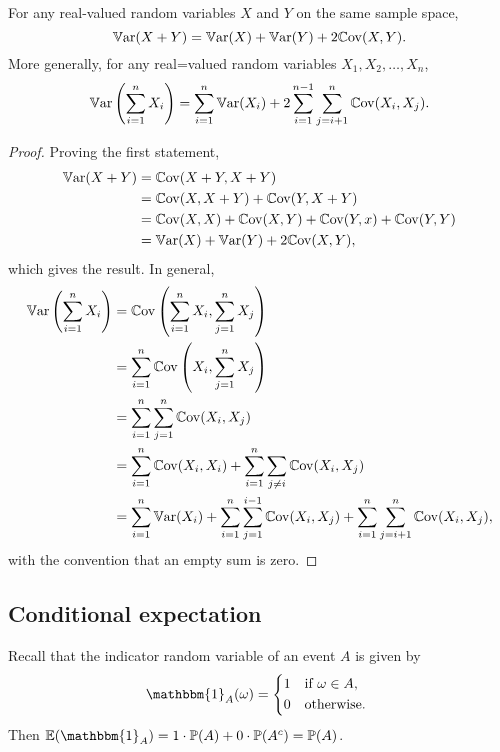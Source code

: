 \documentclass[10pt, a4paper]{article}
\newcommand{\ind}[1][A]{\mathbbm{1}_{#1}}
\begin{document}
\begin{theorem}
    For any real-valued random variables $X$ and $Y$ on the same sample space,
    \[
    \mathbb{V}\mathrm{ar}(X + Y) = \mathbb{V}\mathrm{ar}(X) + \mathbb{V}\mathrm{ar}(Y) + 2\mathbb{C}\mathrm{ov}(X, Y).
    \]
    More generally,
    for any real=valued random variables $X_1, X_2, \dotsc, X_n$,
    \[
    \mathbb{V}\mathrm{ar}\left(\sum_{i = 1}^{n}X_i\right) = \sum_{i = 1}^{n}\mathbb{V}\mathrm{ar}(X_i) + 2\sum_{i = 1}^{n - 1}\sum_{j = i + 1}^{n}\mathbb{C}\mathrm{ov}(X_i, X_j).
    \]
    \begin{proof}
        Proving the first statement,
        \begin{align*}
            \mathbb{V}\mathrm{ar}(X + Y) &= \mathbb{C}\mathrm{ov}(X + Y, X + Y) \\
            &= \mathbb{C}\mathrm{ov}(X, X + Y) + \mathbb{C}\mathrm{ov}(Y, X + Y) \\
            &= \mathbb{C}\mathrm{ov}(X, X) + \mathbb{C}\mathrm{ov}(X, Y) + \mathbb{C}\mathrm{ov}(Y, x) + \mathbb{C}\mathrm{ov}(Y, Y) \\
            &= \mathbb{V}\mathrm{ar}(X) + \mathbb{V}\mathrm{ar}(Y) + 2\mathbb{C}\mathrm{ov}(X, Y),
        \end{align*}
        which gives the result.
        In general,
        \begin{align*}
            \mathbb{V}\mathrm{ar}\left(\sum_{i = 1}^{n}X_i\right) &= \mathbb{C}\mathrm{ov}\left(\sum_{i = 1}^{n}X_i, \sum_{j = 1}^{n}X_j\right) \\
            &= \sum_{i = 1}^{n}\mathbb{C}\mathrm{ov}\left(X_i, \sum_{j = 1}^{n}X_j\right) \\
            &= \sum_{i = 1}^{n}\sum_{j = 1}^{n}\mathbb{C}\mathrm{ov}(X_i, X_j) \\
            &= \sum_{i = 1}^{n}\mathbb{C}\mathrm{ov}(X_i, X_i) + \sum_{i = 1}^{n}\sum_{j \neq i}\mathbb{C}\mathrm{ov}(X_i, X_j) \\
            &= \sum_{i = 1}^{n}\mathbb{V}\mathrm{ar}(X_i) + \sum_{i = 1}^{n}\sum_{j = 1}^{i - 1}\mathbb{C}\mathrm{ov}(X_i, X_j) + \sum_{i = 1}^{n}\sum_{j = i + 1}^{n}\mathbb{C}\mathrm{ov}(X_i, X_j),
        \end{align*}
        with the convention that an empty sum is zero.
    \end{proof}
\end{theorem}

\subsection{Conditional expectation}
Recall that the indicator random variable of an event $A$ is given by
\[
\ind(\omega) = \begin{dcases*}
    1 & if $\omega \in A$, \\
    0 & otherwise.
\end{dcases*}
\]
Then $\E(\ind) = 1 \cdot \P(A) + 0 \cdot \P(A ^ c) = \P(A)$.
\end{document}
